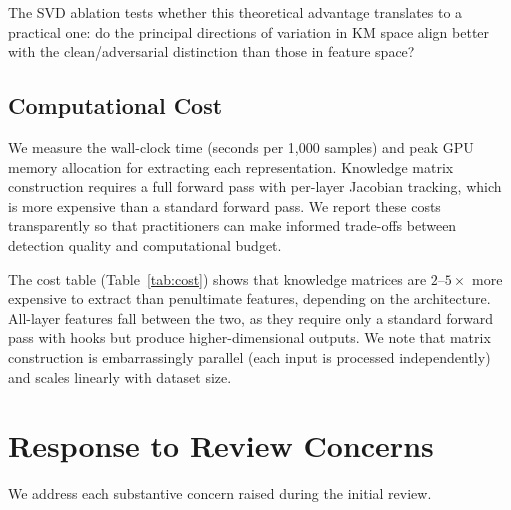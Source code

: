 The SVD ablation tests whether this theoretical advantage translates to a practical one: do the principal directions of variation in KM space align better with the clean/adversarial distinction than those in feature space?


\subsection{Computational Cost}
\label{sec:computational_cost}

We measure the wall-clock time (seconds per 1{,}000 samples) and peak GPU memory allocation for extracting each representation.
Knowledge matrix construction requires a full forward pass with per-layer Jacobian tracking, which is more expensive than a standard forward pass.
We report these costs transparently so that practitioners can make informed trade-offs between detection quality and computational budget.

The cost table (Table~\ref{tab:cost}) shows that knowledge matrices are $2$--$5\times$ more expensive to extract than penultimate features, depending on the architecture.
All-layer features fall between the two, as they require only a standard forward pass with hooks but produce higher-dimensional outputs.
We note that matrix construction is embarrassingly parallel (each input is processed independently) and scales linearly with dataset size.


\section{Response to Review Concerns}
\label{sec:reviewer_response}

We address each substantive concern raised during the initial review.

